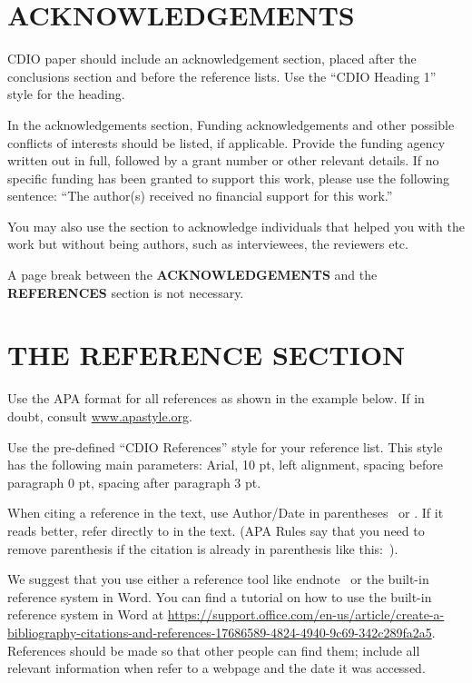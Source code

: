 \documentclass[11pt]{cdio}
\begin{document}
\section{ACKNOWLEDGEMENTS}

CDIO paper should include an acknowledgement section, placed after the conclusions section and before the reference lists.
Use the ``CDIO Heading 1'' style for the heading.

In the acknowledgements section, Funding acknowledgements and other possible conflicts of interests should be listed, if applicable.
Provide the funding agency written out in full, followed by a grant number or other relevant details.
If no specific funding has been granted to support this work, please use the following sentence: ``The author(s) received no financial support for this work.''

You may also use the section to acknowledge individuals that helped you with the work but without being authors, such as interviewees, the reviewers etc.

A page break between the \textbf{ACKNOWLEDGEMENTS} and the \textbf{REFERENCES} section is not necessary.
\section{THE REFERENCE SECTION}
Use the APA format for all references as shown in the example below. If in doubt, consult \url{www.apastyle.org}\parencite{apa2018style}.

Use the pre-defined ``CDIO References'' style for your reference list. This style has the following main parameters: Arial, 10 pt, left alignment, spacing before paragraph 0 pt, spacing after paragraph 3 pt.

When citing a reference in the text, use Author/Date in parentheses~\parencite{biggs2011teaching} or \parencite{malmqvist2012application}.
If it reads better, refer directly to \textcite{lantada2012cdio} in the text.
(APA Rules say that you need to remove parenthesis if the citation is already in parenthesis like this:~).

We suggest that you use either a reference tool like endnote~\parencite{clarivate2018endnote}  or the built-in reference system in Word.
You can find a tutorial on how to use the built-in reference system in Word at \url{https://support.office.com/en-us/article/create-a-bibliography-citations-and-references-17686589-4824-4940-9c69-342c289fa2a5}\parencite{microsoft2018create}.
References should be made so that other people can find them; include all relevant information when refer to a webpage and the date it was accessed.
\end{document}
